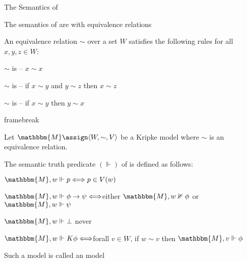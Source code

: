 The Semantics of 
\begin{itemizedot}
  \item The semantics of  are  with
  equivalence relations
  
  \item An equivalence relation $\sim$ over a set $W$ satisfies the following
  rules for all $x, y, z \in W$:
  \begin{itemizedot}
    \item $\sim$ is {} -- $x \sim x$
    
    \item $\sim$ is {} -- if $x \sim y$ and $y \sim z$ then
    $x \sim z$
    
    \item $\sim$ is  -- if $x \sim y$ then $y \sim x$
  \end{itemizedot}
\end{itemizedot}
framebreak
\begin{itemizedot}
  \item Let $\mathbbm{M} \assign \langle W, \sim, V \rangle$ be a Kripke model
  where $\sim$ is an equivalence relation.
  
  \item The semantic truth predicate $(\Vdash)$ of  is defined as
  follows:
  \begin{itemizedot}
    \item $\mathbbm{M}, w \Vdash p \Longleftrightarrow p \in V (w)$
    
    \item $\mathbbm{M}, w \Vdash \phi \rightarrow \psi
    \Longleftrightarrow$either $\mathbbm{M}, w \nVdash \phi$ or $\mathbbm{M},
    w \Vdash \psi$
    
    \item $\mathbbm{M}, w \Vdash \bot$ never
    
    \item $\mathbbm{M}, w \Vdash K \phi \Longleftrightarrow$forall $v \in W$,
    if $w \sim v$ then $\mathbbm{M}, v \Vdash \phi$
  \end{itemizedot}
  \item Such a model is called an  model
\end{itemizedot}


